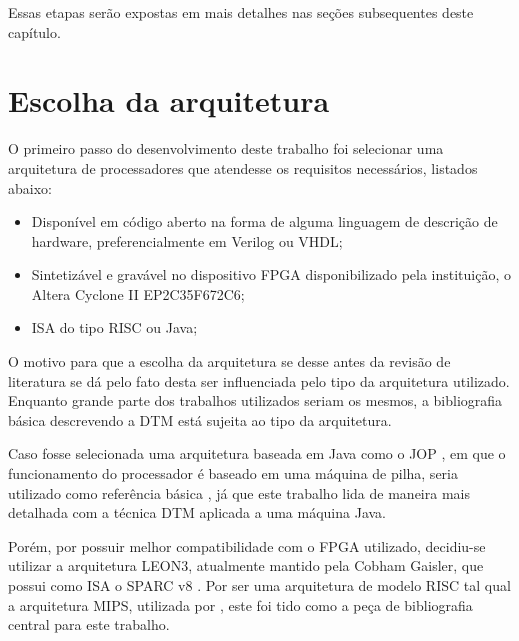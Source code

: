 Essas etapas serão expostas em mais detalhes nas seções subsequentes deste capítulo.

\section{Escolha da arquitetura} 
\label{Metodologia:Arquitetura}

O primeiro passo do desenvolvimento deste trabalho foi selecionar uma arquitetura de processadores que atendesse os requisitos necessários, listados abaixo:

\begin{itemize}
	
	\item Disponível em código aberto na forma de alguma linguagem de descrição de hardware, preferencialmente em Verilog ou VHDL;
	
	\item Sintetizável e gravável no dispositivo FPGA disponibilizado pela instituição, o Altera Cyclone II EP2C35F672C6;
	
	\item ISA do tipo RISC ou Java;
	
	
\end{itemize}

O motivo para que a escolha da arquitetura se desse antes da revisão de literatura se dá pelo fato desta ser influenciada pelo tipo da arquitetura utilizado. Enquanto grande parte dos trabalhos utilizados seriam os mesmos, a bibliografia básica descrevendo a DTM está sujeita ao tipo da arquitetura.

Caso fosse selecionada uma arquitetura baseada em Java como o JOP \cite{schoeberl2005jop}, em que o funcionamento do processador é baseado em uma máquina de pilha, seria utilizado como referência básica , já que este trabalho lida de maneira mais detalhada com a técnica DTM aplicada a uma máquina Java.

Porém, por possuir melhor compatibilidade com o FPGA utilizado, decidiu-se utilizar a arquitetura LEON3, atualmente mantido pela Cobham Gaisler, que possui como ISA o SPARC v8 \cite{gaisler2010leon3}. Por ser uma arquitetura de modelo RISC tal qual a arquitetura MIPS, utilizada por , este foi tido como a peça de bibliografia central para este trabalho.


